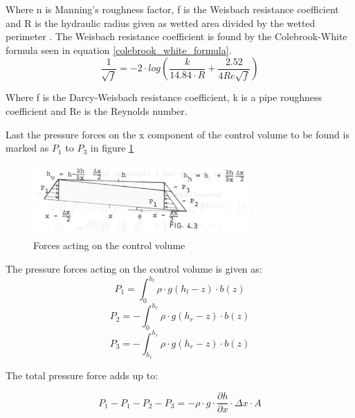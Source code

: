 Where n is Manning's roughness factor, f is the Weisbach resistance coefficient and R is the hydraulic radius given as wetted area divided by the wetted perimeter \cite{stormwatercollectionsystems}.
The Weisbach resistance coefficient is found by the Colebrook-White formula seen in equation \ref{colebrook_white_formula}.
\begin{equation}
\frac{1}{\sqrt{f}} = -2\cdot log \left( \frac{k}{14.84 \cdot R}+ \frac{2.52}{4 Re \sqrt{f}} \right)
\label{colebrook_white_formula}
\end{equation}

Where f is the Darcy-Weisbach resistance coefficient, k is a pipe roughness coefficient and Re is the Reynolds number.

Last the pressure forces on the x component of the control volume to be found is marked as $P_1$ to $P_3$ in figure \ref{fig:forces_on_CV} 

\begin{figure}[H]
\centering
\includegraphics[width=0.75\textwidth]{report/modeling/pictures/palle_fig.png}
\caption{Forces acting on the control volume }
\label{fig:forces_on_CV}
\end{figure}

The pressure forces acting on the control volume is given as:
\begin{equation}
	P_1 = \int_{0}^{h_l} \rho \cdot g (h_l - z)\cdot b(z)
\end{equation}
\begin{equation}
	P_2 = -\int_{0}^{h_r} \rho \cdot g (h_r - z)\cdot b(z)
\end{equation}
\begin{equation}
	P_3 = -\int_{h_l}^{h_r} \rho \cdot g (h_r - z)\cdot b(z)
\end{equation}

The total pressure force adds up to:

\begin{equation}
P_1 - P_1 -P_2 - P_3 = -\rho\cdot g \cdot \frac{\partial h}{\partial x} \cdot \Delta x \cdot A  
\label{pressure_force}
\end{equation}

